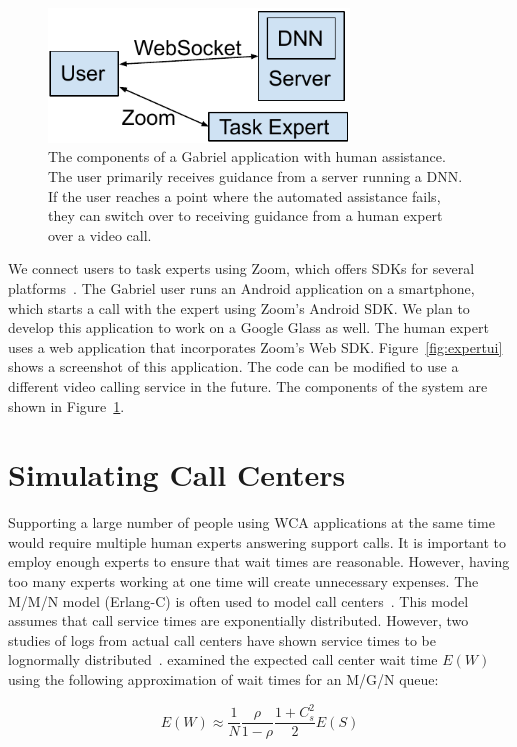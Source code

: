 \begin{figure}[h]
  \includegraphics[width=8cm]{figures/human_assitance.pdf}
  \caption{The components of a Gabriel application with human assistance. The
    user primarily receives guidance from a server running a DNN. If the user
    reaches a point where the automated assistance fails, they can switch over
    to receiving guidance from a human expert over a video call.
  }\label{fig:expert_components}
\end{figure}

We connect users to task experts using Zoom, which offers SDKs for several
platforms~\cite{Zoom}. The Gabriel user runs an Android application on a
smartphone, which starts a call with the expert using Zoom's Android SDK.
We plan to develop this application to work on a Google Glass as well.
The human expert uses a web application that incorporates Zoom's Web SDK.
Figure~\ref{fig:expertui} shows a screenshot of this application. The code can
be modified to use a different video calling service in the future.
The components of the system are shown in Figure~\ref{fig:expert_components}.

\section{Simulating Call Centers}

Supporting a large number of people using WCA applications at the same time
would require multiple human experts answering support calls.
It is important to employ enough experts to ensure that wait times are
reasonable.
However, having too many experts working at one time will create unnecessary
expenses.
The M/M/N model (Erlang-C) is often used to model call centers~\cite{queue1}.
This model assumes that call service times are exponentially distributed.
However, two studies of logs from actual call centers have shown service times
to be lognormally distributed~\cite{queue1, queue2}.
\citet{queue1} examined the expected call center wait time $E(W)$ using the
following approximation of wait times for an M/G/N queue:

\[
E(W) \approx \frac{1}{N} \frac{\rho}{1 - \rho} \frac{1 + C_s^2}{2} E(S)
\]

